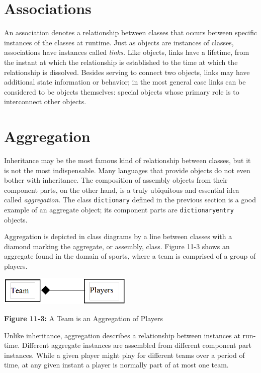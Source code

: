 \section{Associations}

An association denotes a relationship between classes
that occurs between specific instances of the classes at runtime.
Just as objects are instances of classes, associations
have instances called \textit{links.}
Like objects, links have a lifetime, from the instant
at which the relationship is established to the time at which the
relationship is dissolved. Besides serving to connect two objects,
links may have additional state information or behavior; in the most
general case links can be considered to be objects themselves: special
objects whose primary role is to interconnect other objects.

\section{Aggregation}

Inheritance may be the most famous kind of relationship between classes,
but it is not the most indispensable. Many languages that provide
objects do not even bother with inheritance. The composition of
assembly objects from their component parts, on the other hand, is a
truly ubiquitous and essential idea called
\textit{aggregation}. The class \texttt{dictionary}
defined in the previous section is a good example of an aggregate
object; its component parts are \texttt{dictionaryentry} objects.

Aggregation is depicted in class diagrams by a line between classes with
a diamond marking the aggregate, or assembly, class. Figure 11-3
shows an aggregate found in the domain of sports, where a team is
comprised of a group of players.

\begin{center}
\includegraphics[width=2.52in,height=0.54in]{ub-img/aggregat.png} 

{\sffamily\bfseries Figure 11-3:}
{\sffamily A Team is an Aggregation of Players}
\end{center}

Unlike inheritance, aggregation describes a relationship between
instances at run-time. Different aggregate instances are assembled from
different component part instances. While a given player might play for
different teams over a period of time, at any given instant a player is
normally part of at most one team.

